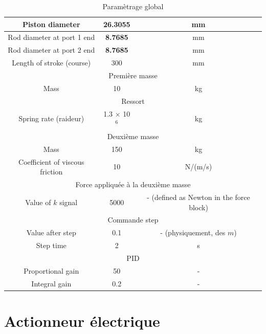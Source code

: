 \documentclass[a4paper,12pt,calibri,oneside,openany]{book}
\theoremstyle{break}
\begin{document}
\begin{table}[H]
\begin{tabular}{|c|c|c|}
		\hline
		Piston diameter & \textbf{26.3055} & mm\\
		\hline
		Rod diameter at port 1 end & \textbf{8.7685} & mm\\
		\hline
		Rod diameter at port 2 end & \textbf{8.7685} & mm\\
		\hline
		Length of stroke (course) & 300 & mm\\
		\hline
		\multicolumn{3}{c}{\cellcolor{green!30}Première masse}\\
		\hline
		Mass & 10 & kg\\
		\hline
		\multicolumn{3}{c}{\cellcolor{green!30}Ressort}\\
		\hline
		Spring rate (raideur) & 1.3 $\times$ 10$^6$ & kg\\
		\hline
		\multicolumn{3}{c}{\cellcolor{green!30}Deuxième masse} \\
		\hline
		Mass & 150 & kg\\
		\hline
		Coefficient of viscous friction & 10 & N/(m/s)\\
		\hline
		\multicolumn{3}{c}{\cellcolor{green!30}Force appliquée à la deuxième masse} \\
		\hline
		Value of $k$ signal & 5000 & - (defined as Newton in the force block)\\
		\hline
		\multicolumn{3}{c}{\cellcolor{green!30}Commande step} \\
		\hline
		Value after step & 0.1 & - (physiquement, des $m$)\\
		\hline
		Step time & 2 & s\\
		\hline
		\multicolumn{3}{c}{\cellcolor{green!30}PID} \\
		\hline
		Proportional gain & 50 & - \\
		\hline
		Integral gain & 0.2 & -\\
		\hline
	\end{tabular}
	\caption{Paramètrage global}
\end{table}
\clearpage
\chapter{Actionneur électrique}
\end{document}
